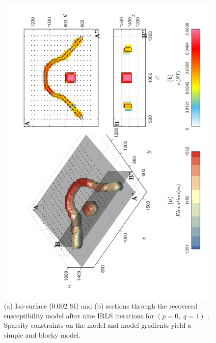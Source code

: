 \newpage
\begin{figure}[h!]
\centering
\includegraphics[scale=0.52, angle =270]{3D_Inv_l0l0_model_INDUCED.pdf}
\caption{ (a) Iso-surface (0.002 SI) and (b) sections through the recovered susceptibility model after nine IRLS iterations for $(p = 0,\; q = 1)$ . Sparsity constraints on the model and model gradients yield a simple and blocky model.}
\label{fig:3D_Inv_l0l0_model_INDUCED}
\end{figure}
